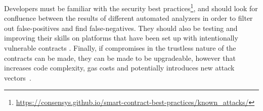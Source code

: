 Developers must be familiar with the security best practices\footnote{\url{https://consensys.github.io/smart-contract-best-practices/known_attacks/}}, and should look for confluence between the results of different automated analyzers in order to filter out false-positives and find false-negatives. They should also be testing and improving their skills on platforms that have been set up with intentionally vulnerable contracts \cite{ethernaut, hackthiscontract, capturetheether}. Finally, if compromises in the trustless nature of the contracts can be made, they can be made to be upgradeable, however that increases code complexity, gas costs and potentially introduces new attack vectors~\cite{upgradeable-contracts}.